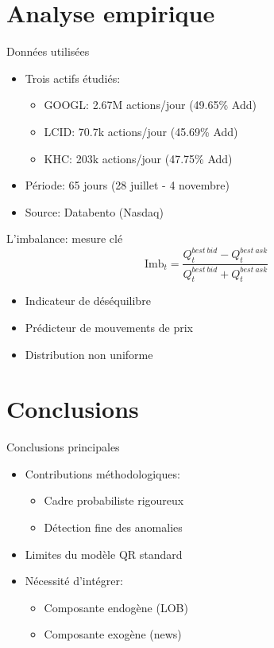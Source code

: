 \documentclass[aspectratio=169]{beamer}  %
\begin{document}
\section{Analyse empirique}

\begin{frame}{Données utilisées}
    \begin{itemize}
        \item Trois actifs étudiés:
        \begin{itemize}
            \item GOOGL: 2.67M actions/jour (49.65\% Add)
            \item LCID: 70.7k actions/jour (45.69\% Add)
            \item KHC: 203k actions/jour (47.75\% Add)
        \end{itemize}
        \item Période: 65 jours (28 juillet - 4 novembre)
        \item Source: Databento (Nasdaq)
    \end{itemize}
\end{frame}

\begin{frame}{L'imbalance: mesure clé}
    \begin{equation*}
        \text{Imb}_t = \frac{Q^{best\ bid}_t-Q^{best\ ask}_t}{Q^{best\ bid}_t+Q^{best\ ask}_t}
    \end{equation*}
    \begin{itemize}
        \item Indicateur de déséquilibre
        \item Prédicteur de mouvements de prix
        \item Distribution non uniforme
    \end{itemize}
\end{frame}

\section{Conclusions}

\begin{frame}{Conclusions principales}
    \begin{itemize}
        \item Contributions méthodologiques:
        \begin{itemize}
            \item Cadre probabiliste rigoureux
            \item Détection fine des anomalies
        \end{itemize}
        \item Limites du modèle QR standard
        \item Nécessité d'intégrer:
        \begin{itemize}
            \item Composante endogène (LOB)
            \item Composante exogène (news)
        \end{itemize}
    \end{itemize}
\end{frame}
\end{document}
